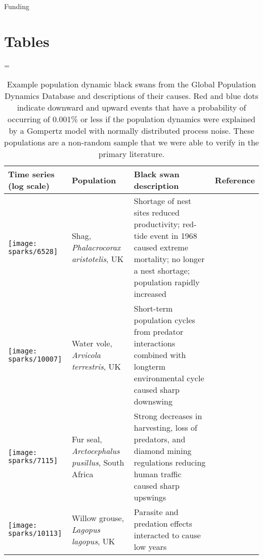 \documentclass[11pt]{article}
\begin{document}
Funding



\clearpage

\section{Tables}

\LTcapwidth=\textwidth
{}

\begin{small}
\begin{longtable}{>{\RaggedRight}m{2.0cm}>{\RaggedRight}p{3.0cm}>{\RaggedRight}p{7.0cm}>{\RaggedRight}p{2.0cm}}

\caption{Example population dynamic black swans from the Global Population Dynamics Database and descriptions of their causes. Red and blue dots indicate downward and upward events that have a probability of occurring of 0.001\% or less if the population dynamics were explained by a Gompertz model with normally distributed process noise. These populations are a non-random sample that we were able to verify in the primary literature.}\\

\toprule
Time series (log scale) & Population & Black swan description & Reference \\
\midrule

\texttt{[image: sparks/6528]} &
Shag,
\textit{Phalacrocorax aristotelis},
UK &
Shortage of nest sites reduced productivity; red-tide event in 1968 caused extreme mortality; no longer a nest shortage; population rapidly increased &
\citep{potts1980}\\

\texttt{[image: sparks/10007]} &
Water vole,
\textit{Arvicola terrestris},
UK &
Short-term population cycles from predator interactions combined with longterm environmental cycle caused sharp downswing  &
\citep{saucy1994}\\

\texttt{[image: sparks/7115]} &
Fur seal,
\textit{Arctocephalus pusillus},
South Africa &
Strong decreases in harvesting, loss of predators, and diamond mining regulations reducing human traffic caused sharp upswings  &
\citep{shaughnessy1982}\\


\texttt{[image: sparks/10113]} &
Willow grouse,
\textit{Lagopus lagopus},
UK &
Parasite and predation effects interacted to cause low years  &
\citep{dobson1995}\\


\end{longtable}
\end{small}
\end{document}
